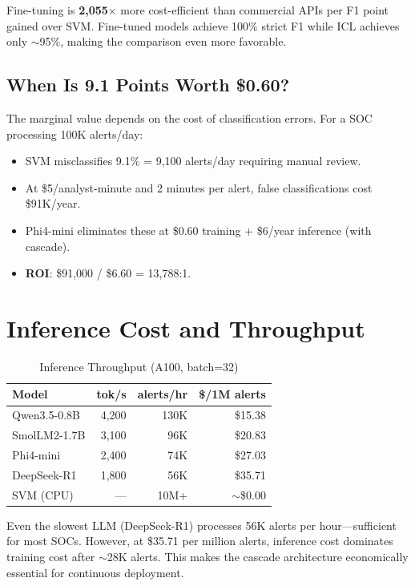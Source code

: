 \documentclass[review,3p]{elsarticle}
\begin{document}
Fine-tuning is \textbf{2,055$\times$} more cost-efficient than commercial APIs per F1 point gained over SVM. Fine-tuned models achieve 100\% strict F1 while ICL achieves only $\sim$95\%, making the comparison even more favorable.

\subsection{When Is 9.1 Points Worth \$0.60?}
The marginal value depends on the cost of classification errors. For a SOC processing 100K alerts/day:
\begin{itemize}
\item SVM misclassifies 9.1\% = 9,100 alerts/day requiring manual review.
\item At \$5/analyst-minute and 2 minutes per alert, false classifications cost \$91K/year.
\item Phi4-mini eliminates these at \$0.60 training + \$6/year inference (with cascade).
\item \textbf{ROI}: \$91,000 / \$6.60 = 13,788:1.
\end{itemize}

\section{Inference Cost and Throughput}

\begin{table}[!ht]
\centering
\caption{Inference Throughput (A100, batch=32)}
\label{tab:inference}
\begin{tabular}{lrrr}
\toprule
\textbf{Model} & \textbf{tok/s} & \textbf{alerts/hr} & \textbf{\$/1M alerts} \\
\midrule
Qwen3.5-0.8B & 4,200 & 130K & \$15.38 \\
SmolLM2-1.7B & 3,100 & 96K & \$20.83 \\
Phi4-mini & 2,400 & 74K & \$27.03 \\
DeepSeek-R1 & 1,800 & 56K & \$35.71 \\
\midrule
SVM (CPU) & --- & 10M+ & $\sim$\$0.00 \\
\bottomrule
\end{tabular}
\end{table}

Even the slowest LLM (DeepSeek-R1) processes 56K alerts per hour---sufficient for most SOCs. However, at \$35.71 per million alerts, inference cost dominates training cost after $\sim$28K alerts. This makes the cascade architecture economically essential for continuous deployment.
\end{document}
